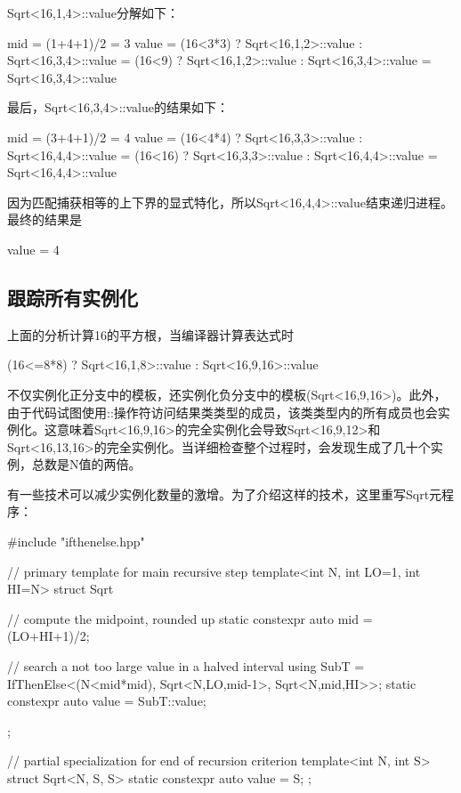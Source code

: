 Sqrt<16,1,4>::value分解如下：

\begin{cpp}
mid = (1+4+1)/2
	= 3
value = (16<3*3) ? Sqrt<16,1,2>::value
				: Sqrt<16,3,4>::value
	  = (16<9) ? Sqrt<16,1,2>::value
				: Sqrt<16,3,4>::value
	  = Sqrt<16,3,4>::value
\end{cpp}

最后，Sqrt<16,3,4>::value的结果如下：

\begin{cpp}
mid = (3+4+1)/2
	= 4
value = (16<4*4) ? Sqrt<16,3,3>::value
				: Sqrt<16,4,4>::value
	  = (16<16) ? Sqrt<16,3,3>::value
				: Sqrt<16,4,4>::value
	  = Sqrt<16,4,4>::value
\end{cpp}

因为匹配捕获相等的上下界的显式特化，所以Sqrt<16,4,4>::value结束递归进程。最终的结果是

\begin{cpp}
value = 4
\end{cpp}

\subsection{跟踪所有实例化}

上面的分析计算16的平方根，当编译器计算表达式时

\begin{cpp}
(16<=8*8) ? Sqrt<16,1,8>::value
		  : Sqrt<16,9,16>::value
\end{cpp}

不仅实例化正分支中的模板，还实例化负分支中的模板(Sqrt<16,9,16>)。此外，由于代码试图使用::操作符访问结果类类型的成员，该类类型内的所有成员也会实例化。这意味着Sqrt<16,9,16>的完全实例化会导致Sqrt<16,9,12>和Sqrt<16,13,16>的完全实例化。当详细检查整个过程时，会发现生成了几十个实例，总数是N值的两倍。

有一些技术可以减少实例化数量的激增。为了介绍这样的技术，这里重写Sqrt元程序：

\begin{cpp}
#include "ifthenelse.hpp"

// primary template for main recursive step
template<int N, int LO=1, int HI=N>
struct Sqrt {
	// compute the midpoint, rounded up
	static constexpr auto mid = (LO+HI+1)/2;
	
	// search a not too large value in a halved interval
	using SubT = IfThenElse<(N<mid*mid),
	Sqrt<N,LO,mid-1>,
	Sqrt<N,mid,HI>>;
	static constexpr auto value = SubT::value;
};

// partial specialization for end of recursion criterion
template<int N, int S>
struct Sqrt<N, S, S> {
	static constexpr auto value = S;
};
\end{cpp}

